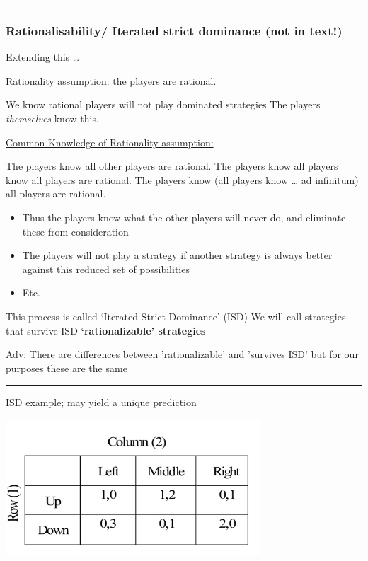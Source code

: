 \documentclass[]{article}
\providecommand{\tightlist}{%
  \setlength{\itemsep}{0pt}\setlength{\parskip}{0pt}}
\begin{document}
\begin{center}\rule{0.5\linewidth}{\linethickness}\end{center}

\hypertarget{rationalisability-iterated-strict-dominance-not-in-text}{%
\subsubsection{Rationalisability/ Iterated strict dominance (not in
text!)}\label{rationalisability-iterated-strict-dominance-not-in-text}}

Extending this \ldots{}

\underline{Rationality assumption:} the players are rational.

We know rational players will not play dominated strategies The players
\emph{themselves} know this.

\bigskip

\underline{Common Knowledge of Rationality assumption:}

The players know all other players are rational. The players know all
players know all players are rational. The players know (all players
know \ldots{} ad infinitum) all players are rational.

\begin{itemize}
\tightlist
\item
  Thus the players know what the other players will never do, and
  eliminate these from consideration
\item
  The players will not play a strategy if another strategy is always
  better against this reduced set of possibilities
\item
  Etc.
\end{itemize}

This process is called `Iterated Strict Dominance' (ISD) We will call
strategies that survive ISD \textbf{`rationalizable' strategies}

\textcolor{RawSienna}{Adv: There are differences between 'rationalizable' and 'survives ISD' but for our purposes these are the same}

\begin{center}\rule{0.5\linewidth}{\linethickness}\end{center}

ISD example; may yield a unique prediction

\includegraphics[height=2in]{picsfigs/matrixforISD.png}
\end{document}
